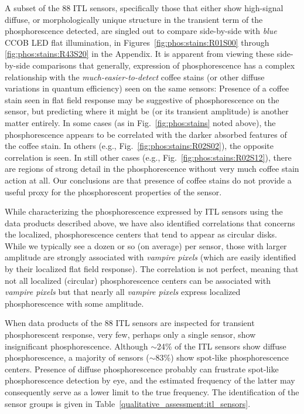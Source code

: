 A subset of the 88 ITL sensors, specifically those that either show high-signal diffuse, or morphologically unique structure in the transient term of the phosphorescence detected, are singled out to compare side-by-side with {\it blue} CCOB LED flat illumination, in Figures~\ref{fig:phos:stains:R01S00} through \ref{fig:phos:stains:R43S20} in the Appendix. It is apparent from viewing these side-by-side comparisons that generally, expression of phosphorescence has a complex relationship with the {\it much-easier-to-detect} coffee stains (or other diffuse variations in quantum efficiency) seen on the same sensors: Presence of a coffee stain seen in flat field response may be suggestive of phosphorescence on the sensor, but predicting where it might be (or its transient amplitude) is another matter entirely. In some cases (as in Fig.~\ref{fig:phos:stains} noted above), the phosphorescence appears to be correlated with the darker absorbed features of the coffee stain. In others (e.g., Fig.~\ref{fig:phos:stains:R02S02}), the opposite correlation is seen. In still other cases (e.g., Fig.~\ref{fig:phos:stains:R02S12}), there are regions of strong detail in the phosphorescence without very much coffee stain action at all. Our conclusions are that presence of coffee stains do not provide a useful proxy for the phosphorescent properties of the sensor.




While characterizing the phosphorescence expressed by ITL sensors using the data products described above, we have also identified correlations that concerns the localized, phosphorescence centers that tend to appear as circular disks. While we typically see a dozen or so (on average) per sensor, those with larger amplitude are strongly associated with {\it vampire pixels} (which are easily identified by their localized flat field response). The correlation is not perfect, meaning that not all localized (circular) phosphorescence centers can be associated with {\it vampire pixels} but that nearly all {\it vampire pixels} express localized phosphorescence with some amplitude. 

When data products of the 88 ITL sensors are inspected for transient phosphorescent response, very few, perhaps only a single sensor, show insignificant phosphorescence. Although $\sim$24\% of the ITL sensors show diffuse phosphorescence, a majority of sensors ($\sim$83\%) show spot-like phosphorescence centers. Presence of diffuse phosphorescence probably can frustrate spot-like phosphorescence detection by eye, and the estimated frequency of the latter may consequently serve as a lower limit to the true frequency. The identification of the sensor groups is given in Table~\ref{qualitative_assessment:itl_sensors}.

